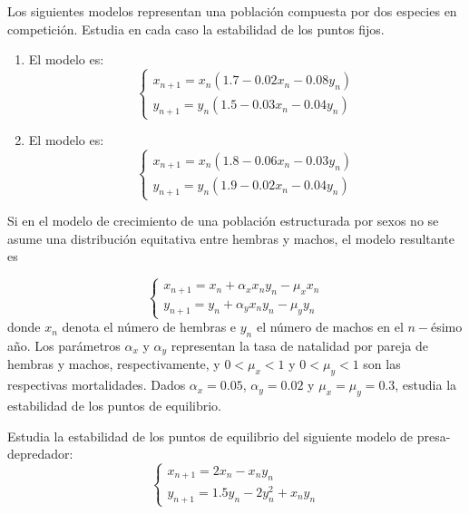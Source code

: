 \begin{ejercicio}
Los siguientes modelos representan una población compuesta por dos especies en competición. Estudia en cada caso la estabilidad de los puntos fijos.
\begin{enumerate}
    \item El modelo es:
    \begin{equation*}
        \begin{cases}
            x_{n+1} = x_n(1.7 - 0.02x_n - 0.08y_n)\\
            y_{n+1} = y_n(1.5 - 0.03x_n - 0.04y_n)
        \end{cases}
    \end{equation*}

    \item El modelo es:
    \begin{equation*}
        \begin{cases}
            x_{n+1} = x_n(1.8 - 0.06x_n - 0.03y_n)\\
            y_{n+1} = y_n(1.9 - 0.02x_n - 0.04y_n)
        \end{cases}
    \end{equation*} 
\end{enumerate}

\end{ejercicio}

\begin{ejercicio}
Si en el modelo de crecimiento de una población estructurada por sexos no se asume una distribución equitativa entre hembras y machos, el modelo resultante es

\begin{equation*}
\begin{cases}
x_{n+1} = x_n + \alpha_x x_n y_n - \mu_x x_n\\
y_{n+1} = y_n + \alpha_y x_n y_n - \mu_y y_n
\end{cases}
\end{equation*}
donde $x_n$ denota el número de hembras e $y_n$ el número de machos en el $n-$ésimo año. Los parámetros $\alpha_x$ y $\alpha_y$ representan la tasa de natalidad por pareja de hembras y machos, respectivamente, y $0 < \mu_x < 1$ y $0 < \mu_y < 1$ son las respectivas mortalidades. Dados $\alpha_x = 0.05$, $\alpha_y = 0.02$ y $\mu_x = \mu_y = 0.3$, estudia la estabilidad de los puntos de equilibrio.
\end{ejercicio}

\begin{ejercicio}
Estudia la estabilidad de los puntos de equilibrio del siguiente modelo de presa-depredador:
\begin{equation*}
\begin{cases}
x_{n+1} = 2x_n - x_n y_n\\
y_{n+1} = 1.5y_n - 2y_n^2 + x_n y_n
\end{cases}
\end{equation*}
\end{ejercicio}
